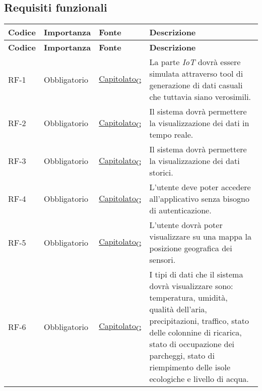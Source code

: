 \subsection{Requisiti funzionali}
\begin{longtable}{|>{\centering\arraybackslash}m{}|>{\centering\arraybackslash}m{}|>{\centering\arraybackslash}m{}|>{\centering\arraybackslash}m{}|}
	\hline
	\textbf{Codice} & \textbf{Importanza} & \textbf{Fonte} & \textbf{Descrizione}\\\hline
	\endfirsthead
	\hline
	\textbf{Codice} & \textbf{Importanza} & \textbf{Fonte} & \textbf{Descrizione}\\\hline
	\endhead
	\hline
	RF-1            & Obbligatorio        & \href{https://7last.github.io/docs/rtb/documentazione-interna/glossario\#capitolato}{Capitolato\textsubscript{G}}     & La parte \textit{IoT} dovrà essere simulata attraverso tool di generazione di dati casuali che tuttavia siano verosimili.
	\\\hline
	RF-2            & Obbligatorio        & \href{https://7last.github.io/docs/rtb/documentazione-interna/glossario\#capitolato}{Capitolato\textsubscript{G}}     & Il sistema dovrà permettere la visualizzazione dei dati in tempo reale.
	\\\hline
	RF-3            & Obbligatorio        & \href{https://7last.github.io/docs/rtb/documentazione-interna/glossario\#capitolato}{Capitolato\textsubscript{G}}     & Il sistema dovrà permettere la visualizzazione dei dati storici.
	\\\hline
	RF-4            & Obbligatorio        & \href{https://7last.github.io/docs/rtb/documentazione-interna/glossario\#capitolato}{Capitolato\textsubscript{G}}     & L'utente deve poter accedere all'applicativo senza bisogno di autenticazione.\\\hline
	RF-5            & Obbligatorio        & \href{https://7last.github.io/docs/rtb/documentazione-interna/glossario\#capitolato}{Capitolato\textsubscript{G}}     & L'utente dovrà poter visualizzare su una mappa la posizione geografica dei sensori.
	\\\hline
	RF-6            & Obbligatorio        & \href{https://7last.github.io/docs/rtb/documentazione-interna/glossario\#capitolato}{Capitolato\textsubscript{G}}     & I tipi di dati che il sistema dovrà visualizzare sono: temperatura, umidità, qualità dell'aria, precipitazioni, traffico, stato delle colonnine di ricarica, stato di occupazione dei parcheggi, stato di riempimento delle isole ecologiche e livello di acqua.

\end{longtable}
